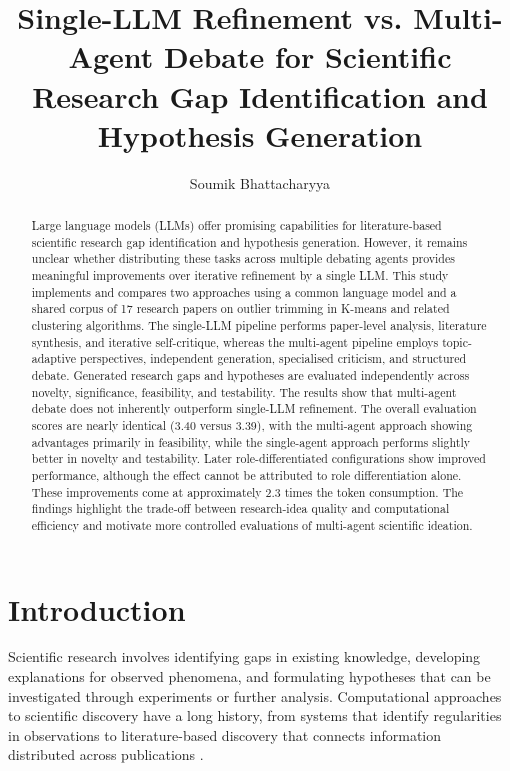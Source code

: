 \documentclass[sigconf,review,anonymous=false]{acmart}
\title{Single-LLM Refinement vs. Multi-Agent Debate for Scientific Research Gap Identification and Hypothesis Generation}
\author{Soumik Bhattacharyya}
\affiliation{%
  \institution{Indian Institute of Information Technology Allahabad}
  \city{Prayagraj}
  \state{Uttar Pradesh}
  \country{India}}
\begin{document}
\begin{abstract}
Large language models (LLMs) offer promising capabilities for literature-based scientific research gap identification and hypothesis generation. However, it remains unclear whether distributing these tasks across multiple debating agents provides meaningful improvements over iterative refinement by a single LLM. This study implements and compares two approaches using a common language model and a shared corpus of 17 research papers on outlier trimming in K-means and related clustering algorithms. The single-LLM pipeline performs paper-level analysis, literature synthesis, and iterative self-critique, whereas the multi-agent pipeline employs topic-adaptive perspectives, independent generation, specialised criticism, and structured debate. Generated research gaps and hypotheses are evaluated independently across novelty, significance, feasibility, and testability. The results show that multi-agent debate does not inherently outperform single-LLM refinement. The overall evaluation scores are nearly identical (3.40 versus 3.39), with the multi-agent approach showing advantages primarily in feasibility, while the single-agent approach performs slightly better in novelty and testability. Later role-differentiated configurations show improved performance, although the effect cannot be attributed to role differentiation alone. These improvements come at approximately 2.3 times the token consumption. The findings highlight the trade-off between research-idea quality and computational efficiency and motivate more controlled evaluations of multi-agent scientific ideation.
\end{abstract}

\maketitle

\section{Introduction}
Scientific research involves identifying gaps in existing knowledge, developing explanations for observed phenomena, and formulating hypotheses that can be investigated through experiments or further analysis. Computational approaches to scientific discovery have a long history, from systems that identify regularities in observations to literature-based discovery that connects information distributed across publications \cite{langley1987scientific,swanson1986undiscovered}.
\end{document}
